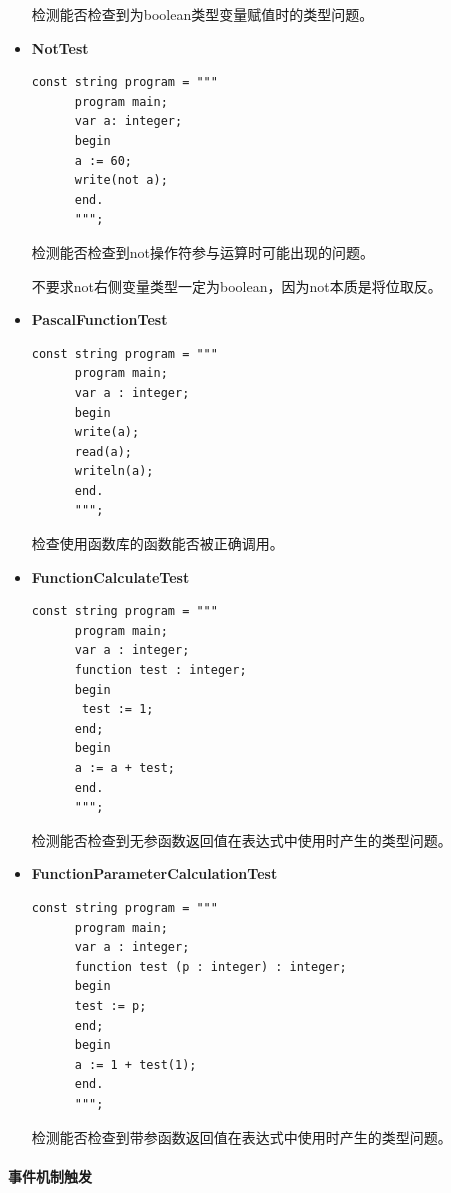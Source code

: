\documentclass[../main.tex]{subfiles}
\begin{document}
\begin{itemize}
检测能否检查到为boolean类型变量赋值时的类型问题。

    \item \textbf{NotTest}
    \begin{lstlisting}[style=csharp]
const string program = """
      program main;
      var a: integer;
      begin
      a := 60;
      write(not a);
      end.
      """;
    \end{lstlisting}
    
检测能否检查到not操作符参与运算时可能出现的问题。

不要求not右侧变量类型一定为boolean，因为not本质是将位取反。

    \item \textbf{PascalFunctionTest}
    \begin{lstlisting}[style=csharp]
const string program = """
      program main;
      var a : integer;
      begin
      write(a);
      read(a);
      writeln(a);
      end.
      """;
    \end{lstlisting}

检查使用函数库的函数能否被正确调用。

    \item \textbf{FunctionCalculateTest}
    \begin{lstlisting}[style=csharp]
const string program = """
      program main;
      var a : integer;
      function test : integer;
      begin
       test := 1;
      end;
      begin
      a := a + test;
      end.
      """;
    \end{lstlisting}

检测能否检查到无参函数返回值在表达式中使用时产生的类型问题。

    \item \textbf{FunctionParameterCalculationTest}
    \begin{lstlisting}[style=csharp]
const string program = """
      program main;
      var a : integer;
      function test (p : integer) : integer;
      begin
      test := p;
      end;
      begin
      a := 1 + test(1);
      end.
      """;
    \end{lstlisting}

检测能否检查到带参函数返回值在表达式中使用时产生的类型问题。
    
\end{itemize}


\paragraph{事件机制触发}
\end{document}
